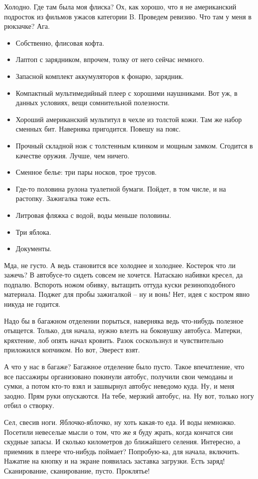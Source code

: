 \documentclass[a4paper]{book}
\begin{document}
Холодно. Где там была моя флиска? Ох, как хорошо, что я не американский подросток из фильмов ужасов категории B. Проведем ревизию. Что там у меня в рюкзачке? Ага.
\begin{itemize}
	\item Собственно, флисовая кофта. 
	\item Лаптоп с зарядником, впрочем, толку от него сейчас немного.
	\item Запасной комплект аккумуляторов к фонарю, зарядник.
	\item Компактный мультимедийный плеер с хорошими наушниками. Вот уж, в данных условиях, вещи сомнительной полезности.
	\item Хороший американский мультитул в чехле из толстой кожи. Там же набор сменных бит. Наверняка пригодится. Повешу на пояс.
	\item Прочный складной нож с толстенным клинком и мощным замком. Сгодится в качестве оружия. Лучше, чем ничего.
	\item Сменное белье: три пары носков, трое трусов. 
	\item Где-то половина рулона туалетной бумаги. Пойдет, в том числе, и на растопку. Зажигалка тоже есть.
	\item Литровая фляжка с водой, воды меньше половины.
	\item Три яблока.
	\item Документы. 
\end{itemize}

Мда, не густо. А ведь становится все холоднее и холоднее. Костерок что ли зажечь? В автобусе-то сидеть совсем не хочется. Натаскаю набивки кресел, да подпалю. Вспороть ножом обивку, вытащить оттуда куски резиноподобного материала. Поджег для пробы зажигалкой -- ну и вонь! Нет, идея с костром явно никуда не годится. 

Надо бы в багажном отделении порыться, наверняка ведь что-нибудь полезное отыщется. Только, для начала, нужно влезть на боковушку автобуса. Матерки, кряхтение, лоб опять начал кровить. Разок соскользнул и чувствительно приложился копчиком. Но вот, Эверест взят. 

А что у нас в багаже? Багажное отделение было пусто. Такое впечатление, что все пассажиры организовано покинули автобус, получили свои чемоданы и сумки, а потом кто-то взял и зашвырнул автобус неведомо куда. Ну, и меня заодно. Прям руки опускаются. На тебе, мерзкий автобус, на. Ну вот, только ногу отбил о створку. 

Сел, свесив ноги. Яблочко-яблочко, ну хоть какая-то еда. И воды немножко. Посетили невеселые мысли о том, что же я буду жрать, когда кончатся сии скудные запасы. И сколько километров до ближайшего селения. Интересно, а приемник в плеере что-нибудь поймает? Попробую-ка, для начала, включить. Нажатие на кнопку и на экране появилась заставка загрузки. Есть заряд! Сканирование, сканирование, пусто. Проклятье! 
\end{document}
